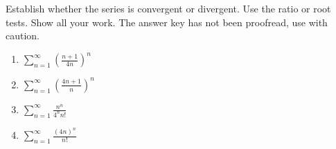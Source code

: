 Establish whether the series is convergent or divergent. Use the ratio or root tests. Show all your work. The answer key has not been proofread, use with caution.
\begin{enumerate}
\item $\displaystyle \sum\limits_{n=1}^{\infty}\left(\frac{n+1 }{4n}\right)^n$
\item $\displaystyle \sum\limits_{n=1}^{\infty}\left(\frac{4n+1 }{n}\right)^n$
\item $\displaystyle \sum\limits_{n=1}^{\infty} \frac{n^n }{4^n n!}$
\item \label{problemConvergenceSum_n=1^infty(4n)^n/nfactorial} $\displaystyle \sum\limits_{n=1}^{\infty} \frac{(4n)^n }{ n!}$
\end{enumerate}